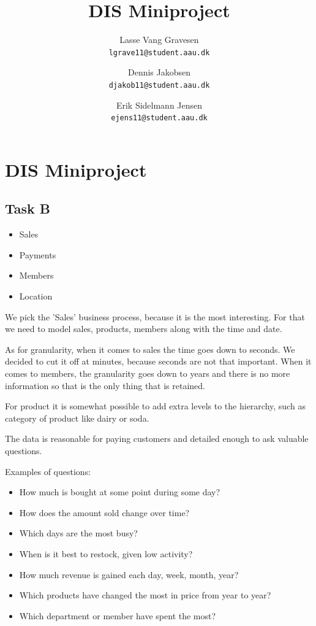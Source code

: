 

\author{
  Lasse Vang Gravesen\\
  \texttt{lgrave11@student.aau.dk}
  \and
  Dennis Jakobsen\\
  \texttt{djakob11@student.aau.dk}
  \and
  Erik Sidelmann Jensen\\
  \texttt{ejens11@student.aau.dk}
}

\title{DIS Miniproject}
\date{}


	\clearpage\maketitle
	\thispagestyle{empty}
	
	\chapter{DIS Miniproject}
	\section{Task B}
	\begin{itemize}
	\item Sales
	\item Payments
	\item Members
	\item Location
	\end{itemize}
	
	We pick the 'Sales' business process, because it is the most interesting. For that we need to model sales, products, members along with the time and date.
	
	As for granularity, when it comes to sales the time goes down to seconds. We decided to cut it off at minutes, because seconds are not that important. When it comes to members, the granularity goes down to years and there is no more information so that is the only thing that is retained. 
	
	For product it is somewhat possible to add extra levels to the hierarchy, such as category of product like dairy or soda.
	
	The data is reasonable for paying customers and detailed enough to ask valuable questions.
	
	Examples of questions:
	\begin{itemize}
	\item How much is bought at some point during some day?
	\item How does the amount sold change over time?
	\item Which days are the most busy?
	\item When is it best to restock, given low activity?
	\item How much revenue is gained each day, week, month, year?
	\item Which products have changed the most in price from year to year?
	\item Which department or member have spent the most?
	\end{itemize}


